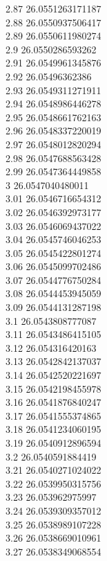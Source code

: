 {2.87	26.0551263171187\\
2.88	26.0550937506417\\
2.89	26.0550611980274\\
2.9	26.0550286593262\\
2.91	26.0549961345876\\
2.92	26.05496362386\\
2.93	26.0549311271911\\
2.94	26.0548986446278\\
2.95	26.0548661762163\\
2.96	26.0548337220019\\
2.97	26.0548012820294\\
2.98	26.0547688563428\\
2.99	26.0547364449858\\
3	26.0547040480011\\
3.01	26.0546716654312\\
3.02	26.0546392973177\\
3.03	26.0546069437022\\
3.04	26.0545746046253\\
3.05	26.0545422801274\\
3.06	26.0545099702486\\
3.07	26.0544776750284\\
3.08	26.0544453945059\\
3.09	26.0544131287198\\
3.1	26.0543808777087\\
3.11	26.0543486415105\\
3.12	26.054316420163\\
3.13	26.0542842137037\\
3.14	26.0542520221697\\
3.15	26.0542198455978\\
3.16	26.0541876840247\\
3.17	26.0541555374865\\
3.18	26.0541234060195\\
3.19	26.0540912896594\\
3.2	26.0540591884419\\
3.21	26.0540271024022\\
3.22	26.0539950315756\\
3.23	26.053962975997\\
3.24	26.0539309357012\\
3.25	26.0538989107228\\
3.26	26.0538669010961\\
3.27	26.0538349068554\\
}
